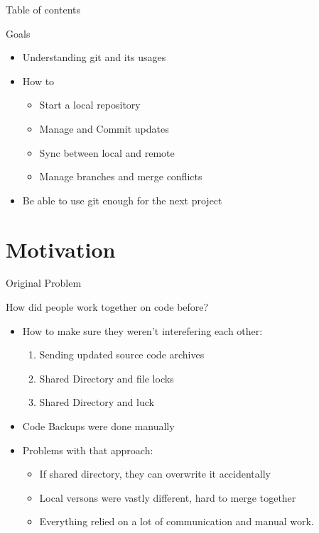 \documentclass[compress,aspectratio=169]{beamer}
\begin{document}
	\begin{frame}[plain]
		\titlepage
	\end{frame}

	\begin{frame}[t]{Table of contents}
		\tableofcontents[subsectionstyle=hide/hide]
	\end{frame}


	\begin{frame}{Goals}
		\begin{itemize}
      \item Understanding git and its usages
      \item How to
        \begin{itemize}
          \item Start a local repository
          \item Manage and Commit updates
          \item Sync between local and remote
          \item Manage branches and merge conflicts
        \end{itemize}
        \item Be able to use git enough for the next project
		\end{itemize}
	\end{frame}

	\section{Motivation}

	\begin{frame}{Original Problem}
    \begin{block}{How did people work together on code before?}
		  \begin{itemize}
        \item How to make sure they weren't interefering each other:
          \begin{enumerate}
            \item Sending updated source code archives
              \pause
            \item Shared Directory and file locks
              \pause
            \item Shared Directory and luck
          \end{enumerate}
          \pause
		  	\item Code Backups were done manually
          \pause
        \item Problems with that approach:
          \begin{itemize}
            \item If shared directory, they can overwrite it accidentally
              \pause
            \item Local versons were vastly different, hard to merge together
              \pause
            \item Everything relied on a lot of communication and manual work.
          \end{itemize}
		  \end{itemize}
    \end{block}
	\end{frame}
\end{document}
